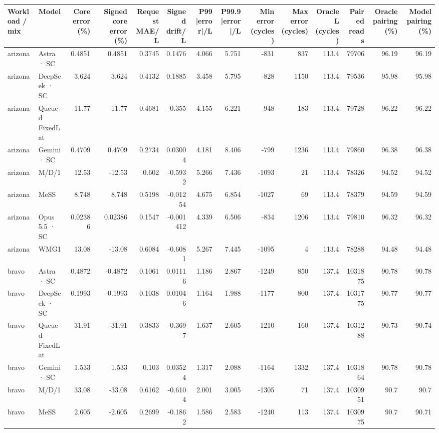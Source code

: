 \begin{tabular}{llrrrrrrrrrrrr}
\toprule
Workload / mix & Model & Core error (\%) & Signed core error (\%) & Request MAE/L & Signed drift/L & P99 |error|/L & P99.9 |error|/L & Min error (cycles) & Max error (cycles) & Oracle L (cycles) & Paired reads & Oracle pairing (\%) & Model pairing (\%) \\
\midrule
arizona & Astra · SC & 0.4851 & 0.4851 & 0.3745 & 0.1476 & 4.066 & 5.751 & -831 & 837 & 113.4 & 79706 & 96.19 & 96.19 \\
arizona & DeepSeek · SC & 3.624 & 3.624 & 0.4132 & 0.1885 & 3.458 & 5.795 & -828 & 1150 & 113.4 & 79536 & 95.98 & 95.98 \\
arizona & Queued FixedLat & 11.77 & -11.77 & 0.4681 & -0.355 & 4.155 & 6.221 & -948 & 183 & 113.4 & 79728 & 96.22 & 96.22 \\
arizona & Gemini · SC & 0.4709 & 0.4709 & 0.2734 & 0.03004 & 4.181 & 8.406 & -799 & 1236 & 113.4 & 79860 & 96.38 & 96.38 \\
arizona & M/D/1 & 12.53 & -12.53 & 0.602 & -0.5932 & 5.266 & 7.436 & -1093 & 21 & 113.4 & 78326 & 94.52 & 94.52 \\
arizona & MeSS & 8.748 & 8.748 & 0.5198 & -0.01254 & 4.675 & 6.854 & -1027 & 69 & 113.4 & 78379 & 94.59 & 94.59 \\
arizona & Opus 5.5 · SC & 0.02386 & 0.02386 & 0.1547 & -0.001412 & 4.339 & 6.506 & -834 & 1206 & 113.4 & 79810 & 96.32 & 96.32 \\
arizona & WMG1 & 13.08 & -13.08 & 0.6084 & -0.6081 & 5.267 & 7.445 & -1095 & 4 & 113.4 & 78288 & 94.48 & 94.48 \\
bravo & Astra · SC & 0.4872 & -0.4872 & 0.1061 & 0.01116 & 1.186 & 2.867 & -1249 & 850 & 137.4 & 1031875 & 90.78 & 90.78 \\
bravo & DeepSeek · SC & 0.1993 & -0.1993 & 0.1038 & 0.01046 & 1.164 & 1.988 & -1177 & 800 & 137.4 & 1031775 & 90.77 & 90.77 \\
bravo & Queued FixedLat & 31.91 & -31.91 & 0.3833 & -0.3697 & 1.637 & 2.605 & -1210 & 160 & 137.4 & 1031288 & 90.73 & 90.74 \\
bravo & Gemini · SC & 1.533 & 1.533 & 0.103 & 0.03524 & 1.317 & 2.088 & -1164 & 1332 & 137.4 & 1031864 & 90.78 & 90.78 \\
bravo & M/D/1 & 33.08 & -33.08 & 0.6162 & -0.6104 & 2.001 & 3.005 & -1305 & 71 & 137.4 & 1030951 & 90.7 & 90.7 \\
bravo & MeSS & 2.605 & -2.605 & 0.2699 & -0.1862 & 1.586 & 2.583 & -1240 & 113 & 137.4 & 1030975 & 90.7 & 90.71 \\

\end{tabular}
